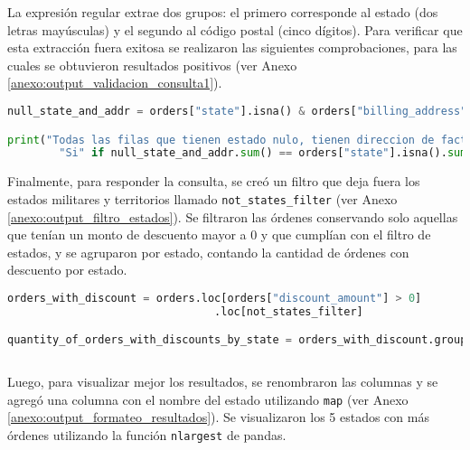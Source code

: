 La expresión regular extrae dos grupos: el primero corresponde al estado (dos letras mayúsculas) y el segundo al código postal (cinco dígitos).
Para verificar que esta extracción fuera exitosa se realizaron las siguientes comprobaciones, para las cuales se obtuvieron resultados positivos (ver Anexo \ref{anexo:output_validacion_consulta1}).

\begin{lstlisting}[language=Python, xleftmargin=25pt, xrightmargin=25pt, ]
null_state_and_addr = orders["state"].isna() & orders["billing_address"].str.contains("UNDEFINED")

print("Todas las filas que tienen estado nulo, tienen direccion de facturacion indefinida?", 
        "Si" if null_state_and_addr.sum() == orders["state"].isna().sum() else "No")
\end{lstlisting}

Finalmente, para responder la consulta, se creó un filtro que deja fuera los estados militares y territorios llamado \texttt{not\_states\_filter} (ver Anexo \ref{anexo:output_filtro_estados}). Se filtraron las órdenes conservando solo aquellas que tenían un monto de descuento mayor a 0 y que cumplían con el filtro de estados, y se agruparon por estado, contando la cantidad de órdenes con descuento por estado.

\begin{lstlisting}[language=Python, xleftmargin=35pt, xrightmargin=35pt, ]
orders_with_discount = orders.loc[orders["discount_amount"] > 0]
                                .loc[not_states_filter]

quantity_of_orders_with_discounts_by_state = orders_with_discount.groupby("state")["order_id"]
                                                                        .count().reset_index()
\end{lstlisting}

Luego, para visualizar mejor los resultados, se renombraron las columnas y se agregó una columna con el nombre del estado utilizando \texttt{map} (ver Anexo \ref{anexo:output_formateo_resultados}). Se visualizaron los 5 estados con más órdenes utilizando la función \texttt{nlargest} de pandas.


